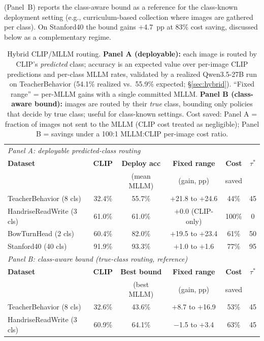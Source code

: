 \documentclass[a4paper,fleqn]{cas-sc}
\begin{document}
 (Panel~B) reports the class-aware bound as a reference for the class-known deployment setting (e.g., curriculum-based collection where images are gathered per class). On Stanford40 the bound gains $+$4.7~pp at 83\% cost saving, discussed below as a complementary regime.

\begin{table}[t]
\caption{Hybrid CLIP/MLLM routing. \textbf{Panel A (deployable):} each image is routed by CLIP's \emph{predicted} class; accuracy is an expected value over per-image CLIP predictions and per-class MLLM rates, validated by a realized Qwen3.5-27B run on TeacherBehavior (54.1\% realized vs.\ 55.9\% expected; \S\ref{sec:hybrid}). ``Fixed range'' = per-MLLM gains with a single committed MLLM. \textbf{Panel B (class-aware bound):} images are routed by their \emph{true} class, bounding only policies that decide by true class; useful for class-known settings. Cost saved: Panel A = fraction of images not sent to the MLLM (CLIP cost treated as negligible); Panel B = savings under a 100:1 MLLM:CLIP per-image cost ratio.}
\label{tab:hybrid}
\centering
\footnotesize
\setlength{\tabcolsep}{2.5pt}
\begin{tabular}{lccccc}
\toprule
\multicolumn{6}{l}{\textit{Panel A: deployable predicted-class routing}} \\
\textbf{Dataset} & \textbf{CLIP} & \textbf{Deploy acc} & \textbf{Fixed range} & \textbf{Cost} & $\tau^*$ \\
 & & (mean MLLM) & (gain, pp) & saved & \\
\midrule
TeacherBehavior (8 cls) & 32.4\% & 55.7\% & $+$21.8 to $+$24.6 & 44\% & 45 \\
HandriseReadWrite (3 cls) & 61.0\% & 61.0\% & $+$0.0 (CLIP-only) & 100\% & 0 \\
BowTurnHead (2 cls) & 60.4\% & 82.0\% & $+$19.5 to $+$23.4 & 61\% & 50 \\
Stanford40 (40 cls) & 91.9\% & 93.3\% & $+$1.0 to $+$1.6 & 77\% & 95 \\
\midrule
\multicolumn{6}{l}{\textit{Panel B: class-aware bound (true-class routing, reference)}} \\
\textbf{Dataset} & \textbf{CLIP} & \textbf{Best bound} & \textbf{Fixed range} & \textbf{Cost} & $\tau^*$ \\
 & & (best MLLM) & (gain, pp) & saved & \\
\midrule
TeacherBehavior (8 cls) & 32.6\% & 43.6\% & $+$8.7 to $+$16.9 & 53\% & 45 \\
HandriseReadWrite (3 cls) & 60.9\% & 64.1\% & $-$1.5 to $+$3.4 & 63\% & 45 \\

\end{tabular}
\end{table}
\end{document}
